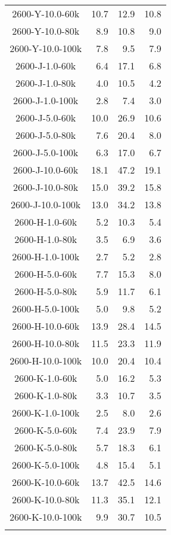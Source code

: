 \begin{longtable}{crrr}
    2600-Y-10.0-60k &  10.7 &   12.9 &  10.8 \\
    2600-Y-10.0-80k &   8.9 &   10.8 &   9.0 \\
    2600-Y-10.0-100k &   7.8 &    9.5 &   7.9 \\
    2600-J-1.0-60k &   6.4 &   17.1 &   6.8 \\
    2600-J-1.0-80k &   4.0 &   10.5 &   4.2 \\
    2600-J-1.0-100k &   2.8 &    7.4 &   3.0 \\
    2600-J-5.0-60k &  10.0 &   26.9 &  10.6 \\
    2600-J-5.0-80k &   7.6 &   20.4 &   8.0 \\
    2600-J-5.0-100k &   6.3 &   17.0 &   6.7 \\
    2600-J-10.0-60k &  18.1 &   47.2 &  19.1 \\
    2600-J-10.0-80k &  15.0 &   39.2 &  15.8 \\
    2600-J-10.0-100k &  13.0 &   34.2 &  13.8 \\
    2600-H-1.0-60k &   5.2 &   10.3 &   5.4 \\
    2600-H-1.0-80k &   3.5 &    6.9 &   3.6 \\
    2600-H-1.0-100k &   2.7 &    5.2 &   2.8 \\
    2600-H-5.0-60k &   7.7 &   15.3 &   8.0 \\
    2600-H-5.0-80k &   5.9 &   11.7 &   6.1 \\
    2600-H-5.0-100k &   5.0 &    9.8 &   5.2 \\
    2600-H-10.0-60k &  13.9 &   28.4 &  14.5 \\
    2600-H-10.0-80k &  11.5 &   23.3 &  11.9 \\
    2600-H-10.0-100k &  10.0 &   20.4 &  10.4 \\
    2600-K-1.0-60k &   5.0 &   16.2 &   5.3 \\
    2600-K-1.0-80k &   3.3 &   10.7 &   3.5 \\
    2600-K-1.0-100k &   2.5 &    8.0 &   2.6 \\
    2600-K-5.0-60k &   7.4 &   23.9 &   7.9 \\
    2600-K-5.0-80k &   5.7 &   18.3 &   6.1 \\
    2600-K-5.0-100k &   4.8 &   15.4 &   5.1 \\
    2600-K-10.0-60k &  13.7 &   42.5 &  14.6 \\
    2600-K-10.0-80k &  11.3 &   35.1 &  12.1 \\
    2600-K-10.0-100k &   9.9 &   30.7 &  10.5 \\
    \label{tab:spirou_precisions}
\end{longtable}




